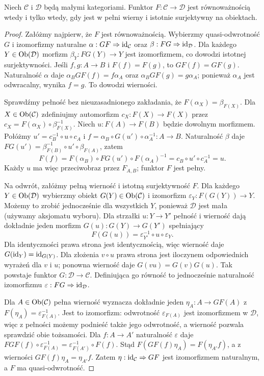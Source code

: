 \begin{twierdzenie}\label{tw:equivalence}
Niech $\mathcal C$ i $\mathcal D$ będą małymi kategoriami. Funktor $F:\mathcal C\to\mathcal D$ jest równoważnością wtedy i tylko wtedy, gdy jest w pełni wierny i istotnie surjektywny na obiektach.
\end{twierdzenie}
\begin{proof}
Załóżmy najpierw, że $F$ jest równoważnością. Wybierzmy quasi-odwrotność $G$ i izomorfizmy naturalne $\alpha:GF\Rightarrow\mathrm{id}_{\mathcal C}$ oraz $\beta:FG\Rightarrow\mathrm{id}_{\mathcal D}$. Dla każdego $Y\in\operatorname{Ob}(\mathcal D)$ morfizm $\beta_Y:FG(Y)\to Y$ jest izomorfizmem, co dowodzi istotnej surjektywności. Jeśli $f,g:A\to B$ i $F(f)=F(g)$, to $GF(f)=GF(g)$. Naturalność $\alpha$ daje $\alpha_BGF(f)=f\alpha_A$ oraz $\alpha_BGF(g)=g\alpha_A$; ponieważ $\alpha_A$ jest odwracalny, wynika $f=g$. To dowodzi wierności.

Sprawdźmy pełność bez nieuzasadnionego zakładania, że $F(\alpha_X)=\beta_{F(X)}$. Dla $X\in\operatorname{Ob}(\mathcal C)$ zdefiniujmy automorfizm $c_X:F(X)\to F(X)$ przez $c_X=F(\alpha_X)\circ\beta_{F(X)}^{-1}$. Niech $u:F(A)\to F(B)$ będzie dowolnym morfizmem. Połóżmy $u'=c_B^{-1}\circ u\circ c_A$ i $f=\alpha_B\circ G(u')\circ\alpha_A^{-1}:A\to B$. Naturalność $\beta$ daje
$FG(u')=\beta_{F(B)}^{-1}\circ u'\circ\beta_{F(A)}$, zatem
\[
F(f)=F(\alpha_B)\circ FG(u')\circ F(\alpha_A)^{-1}
=c_B\circ u'\circ c_A^{-1}=u.
\]
Każdy $u$ ma więc przeciwobraz przez $F_{A,B}$; funktor $F$ jest pełny.

Na odwrót, załóżmy pełną wierność i istotną surjektywność $F$. Dla każdego $Y\in\operatorname{Ob}(\mathcal D)$ wybierzmy obiekt $G(Y)\in\operatorname{Ob}(\mathcal C)$ i izomorfizm $\varepsilon_Y:F(G(Y))\to Y$. Możemy to zrobić jednocześnie dla wszystkich $Y$, ponieważ $\mathcal D$ jest mała (używamy aksjomatu wyboru). Dla strzałki $u:Y\to Y'$ pełność i wierność dają dokładnie jeden morfizm $G(u):G(Y)\to G(Y')$ spełniający
\[
F(G(u))=\varepsilon_{Y'}^{-1}\circ u\circ\varepsilon_Y.
\]
Dla identyczności prawa strona jest identycznością, więc wierność daje $G(\mathrm{id}_Y)=\mathrm{id}_{G(Y)}$. Dla złożenia $v\circ u$ prawa strona jest iloczynem odpowiednich wyrażeń dla $v$ i $u$; ponowna wierność daje $G(vu)=G(v)G(u)$. Tak powstaje funktor $G:\mathcal D\to\mathcal C$. Definiująca go równość to jednocześnie naturalność izomorfizmu $\varepsilon:FG\Rightarrow\mathrm{id}_{\mathcal D}$.

Dla $A\in\operatorname{Ob}(\mathcal C)$ pełna wierność wyznacza dokładnie jeden $\eta_A:A\to GF(A)$ z $F(\eta_A)=\varepsilon_{F(A)}^{-1}$. Jest to izomorfizm: odwrotność $\varepsilon_{F(A)}$ jest izomorfizmem w $\mathcal D$, więc z pełności możemy podnieść także jego odwrotność, a wierność pozwala sprawdzić obie tożsamości. Dla $f:A\to A'$ naturalność $\varepsilon$ daje
$FGF(f)\circ\varepsilon_{F(A)}^{-1}=\varepsilon_{F(A')}^{-1}\circ F(f)$. Stąd
$F(GF(f)\eta_A)=F(\eta_{A'}f)$, a z wierności $GF(f)\eta_A=\eta_{A'}f$. Zatem $\eta:\mathrm{id}_{\mathcal C}\Rightarrow GF$ jest izomorfizmem naturalnym, a $F$ ma quasi-odwrotność.
\end{proof}



